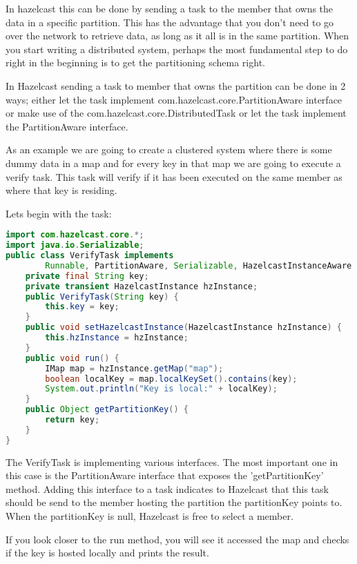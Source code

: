 In hazelcast this can be done by sending a task to the member that owns the data in a specific partition. This has the advantage that you don't need to go over the network to retrieve data, as long as it all is in the same partition. When you start writing a distributed system, perhaps the most fundamental step to do right in the beginning is to get the partitioning schema right.

In Hazelcast sending a task to member that owns the partition can be done in 2 ways; either let the task implement com.hazelcast.core.PartitionAware interface or make use of the com.hazelcast.core.DistributedTask or let the task implement the PartitionAware interface.

As an example we are going to create a clustered system where there is some dummy data in a map and for every key in that map we are going to execute a verify task. This task will verify if it has been executed on the same member as where that key is residing.

Lets begin with the task:
\begin{lstlisting}[language=java]
import com.hazelcast.core.*;
import java.io.Serializable;
public class VerifyTask implements
        Runnable, PartitionAware, Serializable, HazelcastInstanceAware {
    private final String key;
    private transient HazelcastInstance hzInstance;
    public VerifyTask(String key) {
        this.key = key;
    }
    public void setHazelcastInstance(HazelcastInstance hzInstance) {
        this.hzInstance = hzInstance;
    }
    public void run() {
        IMap map = hzInstance.getMap("map");
        boolean localKey = map.localKeySet().contains(key);
        System.out.println("Key is local:" + localKey);
    }
    public Object getPartitionKey() {
        return key;
    }
}
\end{lstlisting}
The VerifyTask is implementing various interfaces. The most important one in this case is the PartitionAware interface that exposes the 'getPartitionKey' method. Adding this interface to a task indicates to Hazelcast that this task should be send to the member hosting the partition the partitionKey points to. When the partitionKey is null, Hazelcast is free to select a member.

If you look closer to the run method, you will see it accessed the map and checks if the key is hosted locally and prints the result.


